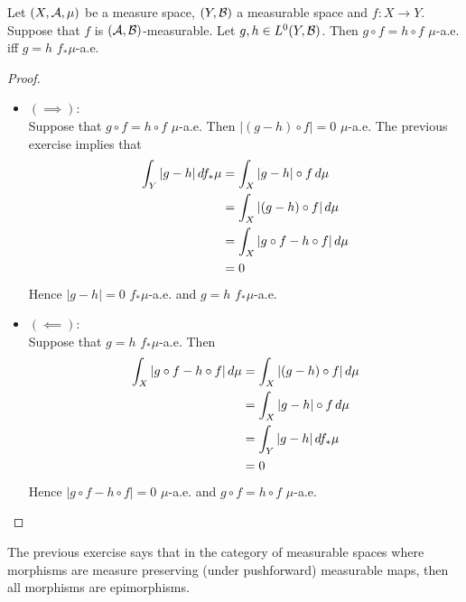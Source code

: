 \documentclass{book}
\begin{document}
	\begin{ex} 
		Let $(X, \mathcal{A}, \mu)$ be a measure space, $(Y, \mathcal{B})$ a measurable space and $f: X \rightarrow Y$. Suppose that $f$ is $(\mathcal{A}, \mathcal{B})$-measurable. Let $g, h \in L^0(Y, \mathcal{B})$. Then $g \circ f = h \circ f$ $\mu$-a.e. iff $g = h$ $f_*\mu$-a.e.
	\end{ex}

	\begin{proof} \
		\begin{itemize}
			\item $(\implies)$: \\
			Suppose that $g \circ f = h \circ f$ $\mu$-a.e. Then $|(g - h) \circ f| = 0$ $\mu$-a.e. The previous exercise implies that 
			\begin{align*}
				\int_Y |g - h|  \, d f_*\mu 
				& = \int_X |g - h| \circ f \, d \mu \\
				& = \int_X |(g - h) \circ f| \, d \mu \\
				& = \int_X |g  \circ f - h  \circ f| \, d \mu \\
				& = 0
			\end{align*}
			Hence $|g - h| = 0$ $f_*\mu$-a.e. and $g = h$ $f_*\mu$-a.e.
			\item $(\impliedby)$: \\
			Suppose that $g = h$ $f_*\mu$-a.e. Then 
			\begin{align*}
				\int_X |g  \circ f - h  \circ f| \, d \mu 
				& = \int_X |(g - h) \circ f| \, d \mu \\
				& = \int_X |g - h| \circ f \, d \mu \\
				& = \int_Y |g - h|  \, d f_*\mu \\
				& = 0
			\end{align*}
			Hence $|g  \circ f - h  \circ f| = 0$  $\mu$-a.e. and $g  \circ f = h  \circ f$ $\mu$-a.e. 
		\end{itemize}
	\end{proof}

	\begin{note}
		The previous exercise says that in the category of measurable spaces where morphisms are measure preserving (under pushforward) measurable maps, then all morphisms are epimorphisms. 
	\end{note}

	
	
	
	
	
	
	
	
	
	
\end{document}
